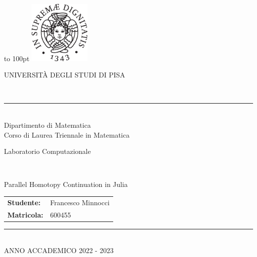 \documentclass[a4paper]{article}
\theoremstyle{definition}
\theoremstyle{definition}
\theoremstyle{remark}
\theoremstyle{definition}
\begin{document}
\begin{titlepage}
    \begin{sffamily}
        \begin{large}
            \begin{center}
                \vbox to 100pt{%
                    \includegraphics[width=3cm]{cherubino}%
                \vfil}
            \end{center}
            \begin{center}
                \begin{Large}
                    \uppercase{Universit\`a degli studi di Pisa}
                \end{Large}\\
                \rule{9cm}{.4pt}\\
                \smallskip
                Dipartimento di Matematica\\
                \medskip
                Corso di Laurea Triennale in
                Matematica\\
                \bigskip\vfill
                \begin{Large}
                    Laboratorio Computazionale
                \end{Large}\\
                \bigskip\bigskip\vfil
                \begin{Huge}
                    Parallel Homotopy Continuation in Julia
                \end{Huge}
                \bigskip\vfill
                \begin{tabular}{ll}
                    \textbf{Studente:} & Francesco Minnocci\\
                    \textbf{Matricola:} & 600455
                \end{tabular}
            \end{center}
            \begin{center}
                \vfill
                \rule{9cm}{.4pt}\\
                \medskip
                \uppercase{Anno Accademico 2022 - 2023}\\
            \end{center}
        \end{large}
    \end{sffamily}
\end{titlepage}
\end{document}
